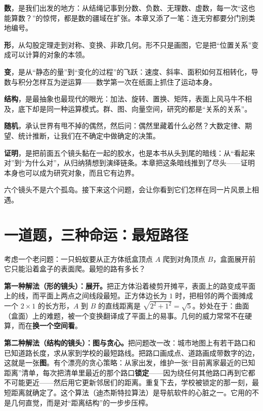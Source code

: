 \textbf{数}，是我们出发的地方：从结绳记事到分数、负数、无理数、虚数，每一次“这也能算数？”的惊愕，都是数的疆域在扩张。本章又添了一笔：连无穷都要分门别类地编号。

\textbf{形}，从勾股定理走到对称、变换、非欧几何。形不只是画图，它是把“位置关系”变成可以计算的对象的本领。

\textbf{变}，是从“静态的量”到“变化的过程”的飞跃：速度、斜率、面积如何互相转化，导数与积分怎样互为逆运算——数学第一次在纸面上抓住了运动本身。

\textbf{结构}，是最抽象也最现代的眼光：加法、旋转、置换、矩阵，表面上风马牛不相及，底下却是同一种运算模式。群、图、向量空间，研究的都是“关系的关系”。

\textbf{随机}，承认世界有甩不掉的偶然，然后问：偶然里藏着什么必然？大数定律、期望、统计推断，让我们在不确定中做确定的决策。

\textbf{证明}，是把前面五个镜头黏在一起的胶水，也是本书从头到尾的暗线：从“看起来对”到“为什么对”，从归纳猜想到演绎链条。本章把这条暗线推到了尽头——证明本身也可以成为研究对象，而且它有边界。

六个镜头不是六个孤岛。接下来这个问题，会让你看到它们怎样在同一片风景上相遇。

\section{一道题，三种命运：最短路径}

考虑一个老问题：一只蚂蚁要从正方体纸盒顶点 $A$ 爬到对角顶点 $B$，盒面展开前它只能沿着盒子的表面爬。最短的路有多长？

\textbf{第一种解法（形的镜头）：展开。}把正方体沿着棱剪开摊平，表面上的路变成平面上的线，而平面上两点之间线段最短。正方体边长为 $1$ 时，把相邻的两个面摊成一个 $2 \times 1$ 的长方形，$A$ 到 $B$ 的直线距离是 $\sqrt{2^2 + 1^2} = \sqrt{5}$。妙处在于：曲面（盒面）上的难题，被一个变换翻译成了平面上的易事。几何的威力常常不在硬算，而在\textbf{换一个空间看}。

\textbf{第二种解法（结构的镜头）：图与贪心。}把问题改一改：城市地图上有若干路口和已知道路长度，求从家到学校的最短路线。把路口画成点、道路画成带数字的边，这就是一张\textbf{图}。有个漂亮的贪心策略：从家出发，维护一张“目前离家最近的已知距离”清单，每次把清单里最近的那个路口\textbf{锁定}——因为绕任何其他路口再到它都不可能更近——然后用它更新邻居们的距离。重复下去，学校被锁定的那一刻，最短距离就确定了。这个算法（迪杰斯特拉算法）是导航软件的心脏之一。它用的不是几何直觉，而是对“距离结构”的一步步压榨。

\begin{center}
\end{center}

